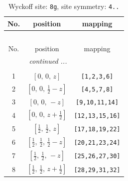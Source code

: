 \documentclass[fleqn,8pt]{jsarticle}
\begin{document}
\begin{longtable}{ccc}
\caption{Wyckoff site: {\tt 8g}, site symmetry: {\tt 4..}}
 \\
 \hline \hline
No. & position & mapping \\ \hline \endfirsthead

\multicolumn{2}{l}{\tablename\ \thetable{}} \\
 \hline \hline
No. & position & mapping \\ \hline \endhead

 \hline \hline
\multicolumn{2}{r}{\footnotesize\it continued ...} \\ \endfoot

 \hline \hline
\multicolumn{2}{r}{} \\ \endlastfoot

1 & $\left[ 0,\, 0,\, z \right]$ & {\tt [1,2,3,6]} \\ \hline
2 & $\left[ 0,\, 0,\, \frac{1}{2} - z \right]$ & {\tt [4,5,7,8]} \\ \hline
3 & $\left[ 0,\, 0,\, - z \right]$ & {\tt [9,10,11,14]} \\ \hline
4 & $\left[ 0,\, 0,\, z + \frac{1}{2} \right]$ & {\tt [12,13,15,16]} \\ \hline
5 & $\left[ \frac{1}{2},\, \frac{1}{2},\, z \right]$ & {\tt [17,18,19,22]} \\ \hline
6 & $\left[ \frac{1}{2},\, \frac{1}{2},\, \frac{1}{2} - z \right]$ & {\tt [20,21,23,24]} \\ \hline
7 & $\left[ \frac{1}{2},\, \frac{1}{2},\, - z \right]$ & {\tt [25,26,27,30]} \\ \hline
8 & $\left[ \frac{1}{2},\, \frac{1}{2},\, z + \frac{1}{2} \right]$ & {\tt [28,29,31,32]} \\
\end{longtable}
\renewcommand{\arraystretch}{1.2}
\end{document}
